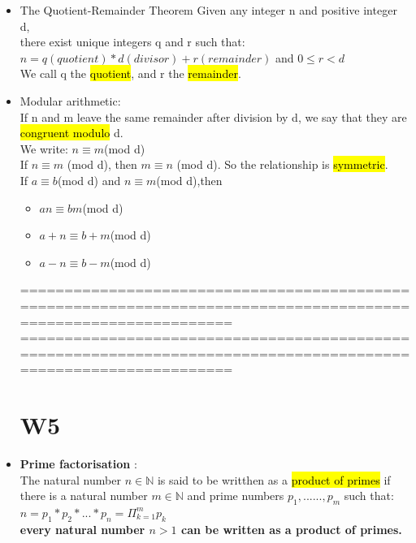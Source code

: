 \documentclass{article}
\begin{document}
\begin{itemize}
\item The Quotient-Remainder Theorem
Given any integer n and positive integer d,\\
there exist unique integers q and r such that:\\
$n = q(quotient)*d(divisor) + r(remainder)$ and $0 \leq r < d$\\
We call q the \hl{quotient}, and r the \hl{remainder}.

\item Modular arithmetic:\\
If n and m leave the same remainder after division by d,
we say that they are \hl{congruent modulo} d.\\
We write: $n \equiv m$(mod d)\\
If $n \equiv m$ (mod d), then $m \equiv n$ (mod d).
So the relationship is \hl{symmetric}.\\

If $a \equiv b$(mod d) and $n \equiv m$(mod d),then
\begin{itemize}
\item $an \equiv bm$(mod d)
\item $a+n \equiv b+m$(mod d)
\item $a-n \equiv b-m$(mod d)
\end{itemize}



================================================================================================================
\newpage
================================================================================================================

\section{W5}

\item \textbf{Prime factorisation} : \\
The natural number $n \in \mathbb{N}$ is said to be writthen as a \hl{product of primes} if there is a natural number $m \in \mathbb{N}$ and prime numbers $p_1,......,p_m$ such that:\\
\textbf{$n = p_1 * p_2 * ... * p_n = \Pi_{k=1}^m p_k$}\\
\textbf{every natural number $n>1$ can be written as a product of primes.}


\end{itemize}
\end{document}
